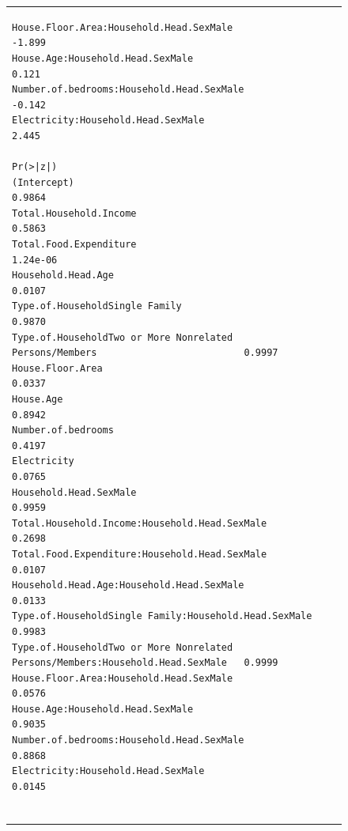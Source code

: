 \documentclass[
]{article}
\begin{document}
\begin{figure}[H]
\begin{table}[H]
\begin{tabular}[t]{lrr}
\begin{verbatim}
House.Floor.Area:Household.Head.SexMale                                         -1.899
House.Age:Household.Head.SexMale                                                 0.121
Number.of.bedrooms:Household.Head.SexMale                                       -0.142
Electricity:Household.Head.SexMale                                               2.445
                                                                               Pr(>|z|)
(Intercept)                                                                      0.9864
Total.Household.Income                                                           0.5863
Total.Food.Expenditure                                                         1.24e-06
Household.Head.Age                                                               0.0107
Type.of.HouseholdSingle Family                                                   0.9870
Type.of.HouseholdTwo or More Nonrelated Persons/Members                          0.9997
House.Floor.Area                                                                 0.0337
House.Age                                                                        0.8942
Number.of.bedrooms                                                               0.4197
Electricity                                                                      0.0765
Household.Head.SexMale                                                           0.9959
Total.Household.Income:Household.Head.SexMale                                    0.2698
Total.Food.Expenditure:Household.Head.SexMale                                    0.0107
Household.Head.Age:Household.Head.SexMale                                        0.0133
Type.of.HouseholdSingle Family:Household.Head.SexMale                            0.9983
Type.of.HouseholdTwo or More Nonrelated Persons/Members:Household.Head.SexMale   0.9999
House.Floor.Area:Household.Head.SexMale                                          0.0576
House.Age:Household.Head.SexMale                                                 0.9035
Number.of.bedrooms:Household.Head.SexMale                                        0.8868
Electricity:Household.Head.SexMale                                               0.0145
                                                                                  

\end{verbatim}
\end{tabular}
\end{table}
\end{figure}
\end{document}
